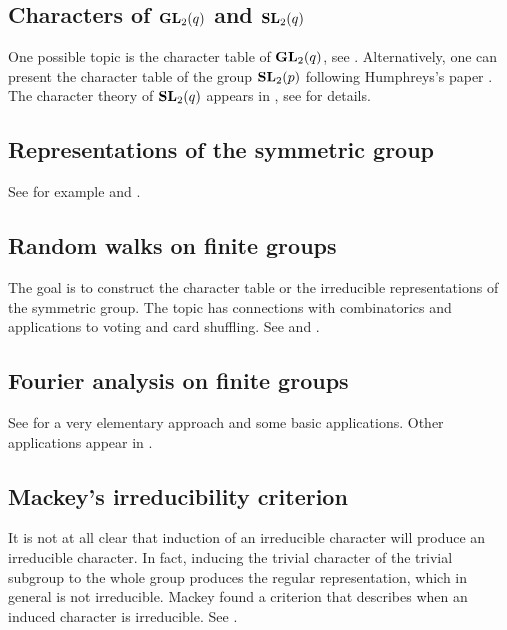 \subsection*{Characters of $\mathbf{GL}_2(q)$ and $\mathbf{SL}_2(q)$}

One possible topic is the character table of $\mathbf{GL}_2(q)$, see
\cite[\S5.2]{MR2867444}. Alternatively, one can 
present the character table of the group $\mathbf{SL}_2(p)$  
following Humphreys's paper \cite{MR364478}. 
The character theory of $\mathbf{SL}_2(q)$ appears in 
\cite[\S5.2]{MR2867444}, see 
\cite[Chapter 20]{MR1650707} for details. 

\subsection*{Representations of the symmetric group}

See for example \cite[\S10]{MR2867444} and 
\cite{MR1153249}. 

\subsection*{Random walks on finite groups}

The goal is to construct the character table or 
the irreducible representations of the symmetric group. 
The topic has connections with combinatorics and applications 
to voting and card shuffling. 
See \cite[4]{MR1153249} and \cite[\S11]{MR2867444}.

\subsection*{Fourier analysis on finite groups}

See \cite[\S5]{MR2867444} for a very elementary approach and some
basic applications. Other applications 
appear in \cite{MR1695775}.



\subsection*{Mackey's irreducibility criterion}

It is not at all clear that 
induction of an irreducible character will produce an irreducible character. In fact, 
inducing the trivial character of the trivial subgroup to the whole group produces the 
regular representation, which in general is not irreducible. Mackey found a criterion 
that describes when an induced character is irreducible. See \cite[\S8.3]{MR2867444}. 

